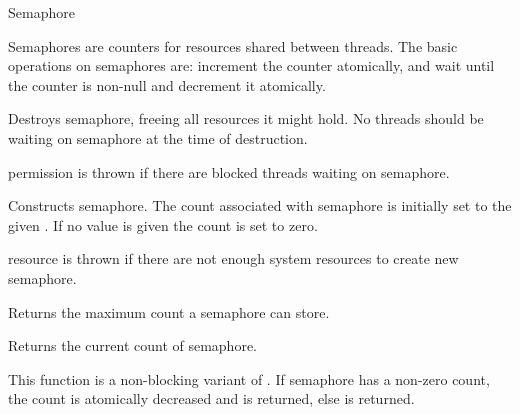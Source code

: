 
\begin{classpage}{Semaphore}

Semaphores are counters for resources shared between threads. The
basic operations on semaphores are: increment the counter atomically,
and wait until the counter is non-null and decrement it atomically.


\begin{mandescription}
  \destructor
  Destroys  semaphore, freeing all resources it might
  hold. No threads should be waiting on  semaphore at the
  time of destruction.
  \begin{exception}
    \item[permission] is thrown if there are blocked
      threads waiting on  semaphore.
  \end{exception}

  Constructs  semaphore. The count associated with
   semaphore is initially set to the given
  . If no value is given the count is set to zero.
  \begin{exception}
    \item[resource] is thrown if there are not
      enough system resources to create  new semaphore.
  \end{exception}

  Returns the maximum count a semaphore can store.

  Returns the current count of  semaphore.

  This function is a non-blocking variant of 
  . If  semaphore has a non-zero
  count, the count is atomically decreased and  is
  returned, else  is returned.


\end{mandescription}
\end{classpage}

